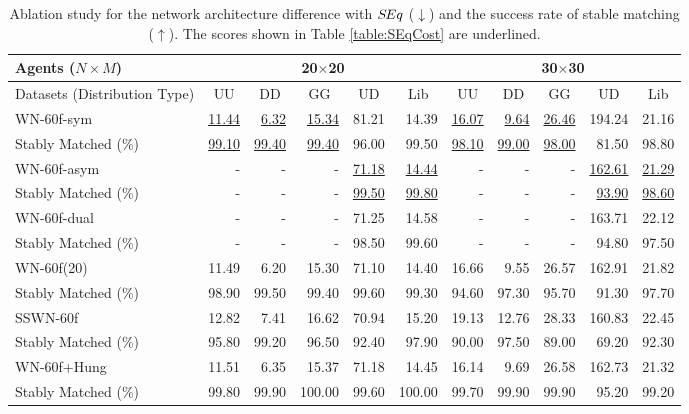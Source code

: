\begin{table}[th!]
\setul{1pt}{.4pt}
\centering
{\small

\begin{tabular}{lrrrrr|rrrrr}
\toprule
Agents ($N\times M$) & \multicolumn{5}{c|}{20$\times$20}  & \multicolumn{5}{c}{30$\times$30}  \\ \midrule
      Datasets (Distribution Type)     & \multicolumn{1}{c}{UU}    & \multicolumn{1}{c}{DD}    & \multicolumn{1}{c}{GG}    & \multicolumn{1}{c}{UD}     & \multicolumn{1}{c}{Lib}    & \multicolumn{1}{|c}{UU}    & \multicolumn{1}{c}{DD}    & \multicolumn{1}{c}{GG}    & \multicolumn{1}{c}{UD}     & \multicolumn{1}{c}{Lib} \\ \midrule
WN-60f-sym             & \ul{11.44}  & \ul{6.32} &  \ul{15.34} & 81.21 & 14.39 & \ul{16.07} & \ul{9.64}  & \ul{26.46} & 194.24  & 21.16 \\
Stably Matched (\%)  & \ul{99.10} & \ul{99.40}  & \ul{99.40} & 96.00  & 99.50 & \ul{98.10}  & \ul{99.00}  & \ul{98.00} & 81.50  & 98.80 \\ \midrule
WN-60f-asym          & -& -& -& \ul{71.18} & \ul{14.44} & -& -& -& \ul{162.61} & \ul{21.29} \\
Stably Matched (\%)  & -& -& -& \ul{99.50} & \ul{99.80} & -& -& -& \ul{93.90} & \ul{98.60}\\ \midrule
WN-60f-dual          & -& -& -& 71.25 & 14.58 & - & - & - & 163.71 & 22.12\\
Stably Matched (\%)  & -& -& -& 98.50 & 99.60 & - & - & - & 94.80  & 97.50 \\ \midrule
WN-60f(20)          & 11.49 & 6.20 & 15.30 & 71.10 & 14.40 & 16.66 & 9.55 & 26.57 & 162.91 &  21.82 \\
Stably Matched (\%) & 98.90 & 99.50 & 99.40 & 99.60 & 99.30 & 94.60 & 97.30 & 95.70 & 91.30 & 97.70 \\ \midrule
SSWN-60f          &  12.82 & 7.41 & 16.62 & 70.94 & 15.20 & 19.13 & 12.76 & 28.33 & 160.83 & 22.45 \\
Stably Matched (\%)  & 95.80 & 99.20 & 96.50 & 92.40 & 97.90 & 90.00 & 97.50 & 89.00 & 69.20 & 92.30  \\ \midrule \midrule
WN-60f+Hung &   11.51 &	6.35 & 15.37 &	71.18 &	14.45 &	16.14 &	9.69 & 26.58 & 	162.73 & 21.32  \\ 
Stably Matched (\%)  &  99.80 & 99.90 & 100.00 & 99.60 & 100.00 & 99.70 & 99.90 & 99.90 & 95.20 & 99.20 \\ \bottomrule
\end{tabular}
}
\caption{Ablation study for the network architecture difference with $S\hspace{-0.1em}Eq$ ($\downarrow$) and the success rate of stable matching ($\uparrow$). The scores shown in Table \ref{table:SEqCost} are underlined.}
\end{table}


